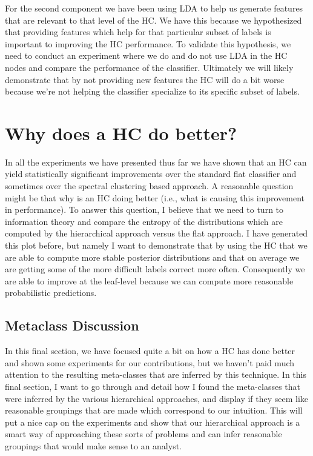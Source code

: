 \documentclass[../thesis.tex]{subfiles}
\begin{document}
For the second component we have been using LDA to help us generate features that are relevant to that level of the HC. We have this because we hypothesized that providing features which help for that particular subset of labels is important to improving the HC performance. To validate this hypothesis, we need to conduct an experiment where we do and do not use LDA in the HC nodes and compare the performance of the classifier. Ultimately we will likely demonstrate that by not providing new features the HC will do a bit worse because we're not helping the classifier specialize to its specific subset of labels.

\section{Why does a HC do better?}
In all the experiments we have presented thus far we have shown that an HC can yield statistically significant improvements over the standard flat classifier and sometimes over the spectral clustering based approach. A reasonable question might be that why is an HC doing better (i.e., what is causing this improvement in performance). To answer this question, I believe that we need to turn to information theory and compare the entropy of the distributions which are computed by the hierarchical approach versus the flat approach. I have generated this plot before, but namely I want to demonstrate that by using the HC that we are able to compute more stable posterior distributions and that on average we are getting some of the more difficult labels correct more often. Consequently we are able to improve at the leaf-level because we can compute more reasonable probabilistic predictions.

\subsection{Metaclass Discussion}
In this final section, we have focused quite a bit on how a HC has done better and shown some experiments for our contributions, but we haven't paid much attention to the resulting meta-classes that are inferred by this technique. In this final section, I want to go through and detail how I found the meta-classes that were inferred by the various hierarchical approaches, and display if they seem like reasonable groupings that are made which correspond to our intuition. This will put a nice cap on the experiments and show that our hierarchical approach is a smart way of approaching these sorts of problems and can infer reasonable groupings that would make sense to an analyst.
\end{document}
